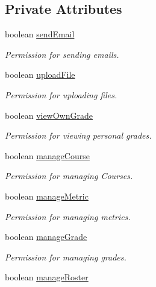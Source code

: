 \subsection*{Private Attributes}
\begin{CompactItemize}
\item 
boolean \hyperlink{classPermissions_04adc389970c51020670fe42a8760d8b}{sendEmail}
\begin{CompactList}\small\item\em Permission for sending emails. \item\end{CompactList}\item 
boolean \hyperlink{classPermissions_8621c8bad77f0aa3eaf7aaeb963253cc}{uploadFile}
\begin{CompactList}\small\item\em Permission for uploading files. \item\end{CompactList}\item 
boolean \hyperlink{classPermissions_7a2909f11c0dd0e9536acda794b1fce5}{viewOwnGrade}
\begin{CompactList}\small\item\em Permission for viewing personal grades. \item\end{CompactList}\item 
boolean \hyperlink{classPermissions_bb9b1027fe18ccf88f8f5d4bfa2b2670}{manageCourse}
\begin{CompactList}\small\item\em Permission for managing Courses. \item\end{CompactList}\item 
boolean \hyperlink{classPermissions_aff2d90005bf252608cb96138e5dab8a}{manageMetric}
\begin{CompactList}\small\item\em Permission for managing metrics. \item\end{CompactList}\item 
boolean \hyperlink{classPermissions_f9be252bbd23a90b832a014331a72a19}{manageGrade}
\begin{CompactList}\small\item\em Permission for managing grades. \item\end{CompactList}\item 
boolean \hyperlink{classPermissions_0ff314a0d75f9d8b5ca644bf53a4b9a3}{manageRoster}

\end{CompactItemize}
